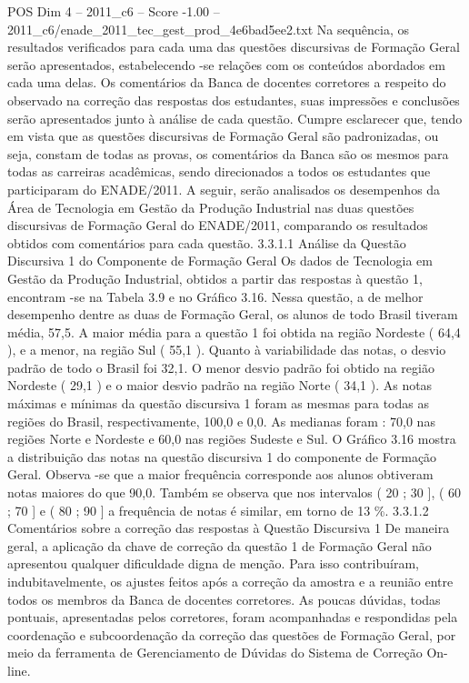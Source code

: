 \begin{textsample}{POS Dim 4 – 2011\_c6 – Score -1.00 – 2011\_c6/enade\_2011\_tec\_gest\_prod\_4e6bad5ee2.txt}
Na sequência, os resultados verificados para cada uma das questões discursivas de Formação Geral serão apresentados, estabelecendo -se relações com os conteúdos abordados em cada uma delas.
Os comentários da Banca de docentes corretores a respeito do observado na correção das respostas dos estudantes, suas impressões e conclusões serão apresentados junto à análise de cada questão.
Cumpre esclarecer que, tendo em vista que as questões discursivas de Formação Geral são padronizadas, ou seja, constam de todas as provas, os comentários da Banca são os mesmos para todas as carreiras acadêmicas, sendo direcionados a todos os estudantes que participaram do ENADE/2011.
A seguir, serão analisados os desempenhos da Área de Tecnologia em Gestão da Produção Industrial nas duas questões discursivas de Formação Geral do ENADE/2011, comparando os resultados obtidos com comentários para cada questão. 3.3.1.1 Análise da Questão Discursiva 1 do Componente de Formação Geral Os dados de Tecnologia em Gestão da Produção Industrial, obtidos a partir das respostas à questão 1, encontram -se na Tabela 3.9 e no Gráfico 3.16.
Nessa questão, a de melhor desempenho dentre as duas de Formação Geral, os alunos de todo Brasil tiveram média, 57,5.
A maior média para a questão 1 foi obtida na região Nordeste ( 64,4 ), e a menor, na região Sul ( 55,1 ).
Quanto à variabilidade das notas, o desvio padrão de todo o Brasil foi 32,1.
O menor desvio padrão foi obtido na região Nordeste ( 29,1 ) e o maior desvio padrão na região Norte ( 34,1 ).
As notas máximas e mínimas da questão discursiva 1 foram as mesmas para todas as regiões do Brasil, respectivamente, 100,0 e 0,0.
As medianas foram : 70,0 nas regiões Norte e Nordeste e 60,0 nas regiões Sudeste e Sul.
O Gráfico 3.16 mostra a distribuição das notas na questão discursiva 1 do componente de Formação Geral.
Observa -se que a maior frequência corresponde aos alunos obtiveram notas maiores do que 90,0.
Também se observa que nos intervalos ( 20 ; 30 ], ( 60 ; 70 ] e ( 80 ; 90 ] a frequência de notas é similar, em torno de 13 \%. 3.3.1.2 Comentários sobre a correção das respostas à Questão Discursiva 1 De maneira geral, a aplicação da chave de correção da questão 1 de Formação Geral não apresentou qualquer dificuldade digna de menção.
Para isso contribuíram, indubitavelmente, os ajustes feitos após a correção da amostra e a reunião entre todos os membros da Banca de docentes corretores.
As poucas dúvidas, todas pontuais, apresentadas pelos corretores, foram acompanhadas e respondidas pela coordenação e subcoordenação da correção das questões de Formação Geral, por meio da ferramenta de Gerenciamento de Dúvidas do Sistema de Correção On-line.

\end{textsample}
